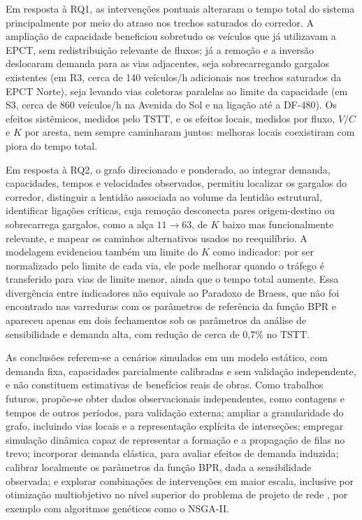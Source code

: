 \documentclass[portuguese]{sbc2025}%
\begin{document}
Em resposta à RQ1, as intervenções pontuais alteraram o tempo total do sistema principalmente por meio do atraso nos trechos saturados do corredor. A ampliação de capacidade beneficiou sobretudo os veículos que já utilizavam a EPCT, sem redistribuição relevante de fluxos; já a remoção e a inversão deslocaram demanda para as vias adjacentes, seja sobrecarregando gargalos existentes (em R3, cerca de 140 veículos/h adicionais nos trechos saturados da EPCT Norte), seja levando vias coletoras paralelas ao limite da capacidade (em S3, cerca de 860 veículos/h na Avenida do Sol e na ligação até a DF-480). Os efeitos sistêmicos, medidos pelo TSTT, e os efeitos locais, medidos por fluxo, $V/C$ e $K$ por aresta, nem sempre caminharam juntos: melhoras locais coexistiram com piora do tempo total.

Em resposta à RQ2, o grafo direcionado e ponderado, ao integrar demanda, capacidades, tempos e velocidades observados, permitiu localizar os gargalos do corredor, distinguir a lentidão associada ao volume da lentidão estrutural, identificar ligações críticas, cuja remoção desconecta pares origem-destino ou sobrecarrega gargalos, como a alça $11\rightarrow63$, de $K$ baixo mas funcionalmente relevante, e mapear os caminhos alternativos usados no reequilíbrio. A modelagem evidenciou também um limite do $K$ como indicador: por ser normalizado pelo limite de cada via, ele pode melhorar quando o tráfego é transferido para vias de limite menor, ainda que o tempo total aumente. Essa divergência entre indicadores não equivale ao Paradoxo de Braess, que não foi encontrado nas varreduras com os parâmetros de referência da função BPR e apareceu apenas em dois fechamentos sob os parâmetros da análise de sensibilidade e demanda alta, com redução de cerca de 0,7\% no TSTT.

As conclusões referem-se a cenários simulados em um modelo estático, com demanda fixa, capacidades parcialmente calibradas e sem validação independente, e não constituem estimativas de benefícios reais de obras. Como trabalhos futuros, propõe-se obter dados observacionais independentes, como contagens e tempos de outros períodos, para validação externa; ampliar a granularidade do grafo, incluindo vias locais e a representação explícita de interseções; empregar simulação dinâmica capaz de representar a formação e a propagação de filas no trevo; incorporar demanda elástica, para avaliar efeitos de demanda induzida; calibrar localmente os parâmetros da função BPR, dada a sensibilidade observada; e explorar combinações de intervenções em maior escala, inclusive por otimização multiobjetivo no nível superior do problema de projeto de rede \cite{leblanc1975dndp}, por exemplo com algoritmos genéticos como o NSGA-II.
\end{document}
